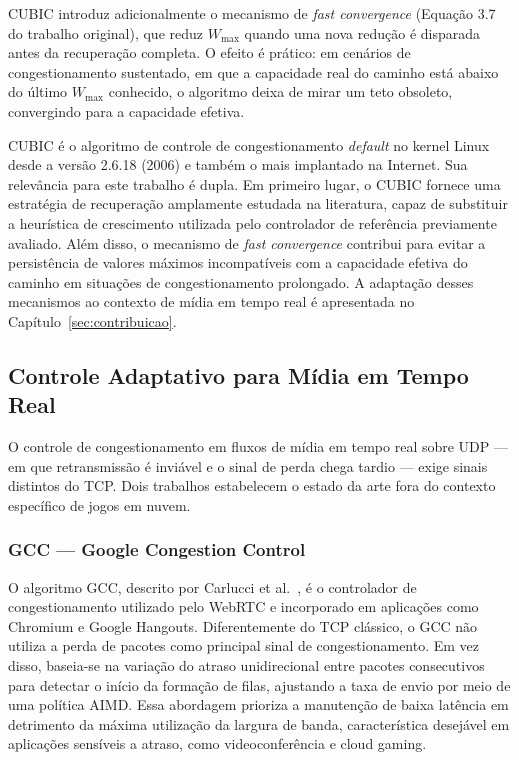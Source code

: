 CUBIC introduz adicionalmente o mecanismo de \emph{fast
convergence} (Equação 3.7 do trabalho original), que reduz
$W_{\max}$ quando uma nova redução é disparada antes da
recuperação completa. O efeito é prático: em cenários de
congestionamento sustentado, em que a capacidade real do
caminho está abaixo do último $W_{\max}$ conhecido, o algoritmo
deixa de mirar um teto obsoleto, convergindo para a capacidade
efetiva.

CUBIC é o algoritmo de controle de congestionamento \emph{default}
no kernel Linux desde a versão 2.6.18 (2006) e também o
mais implantado na Internet. Sua relevância para este trabalho é dupla. Em primeiro lugar,
o CUBIC fornece uma estratégia de recuperação amplamente estudada
na literatura, capaz de substituir a heurística de crescimento
utilizada pelo controlador de referência previamente avaliado.
Além disso, o mecanismo de \emph{fast convergence} contribui para
evitar a persistência de valores máximos incompatíveis com a
capacidade efetiva do caminho em situações de congestionamento
prolongado. A adaptação desses mecanismos ao contexto de mídia em
tempo real é apresentada no Capítulo~\ref{sec:contribuicao}.

\subsection{Controle Adaptativo para Mídia em Tempo Real}

O controle de congestionamento em fluxos de mídia em tempo real
sobre UDP — em que retransmissão é inviável e o sinal de perda
chega tardio — exige sinais distintos do TCP. Dois trabalhos
estabelecem o estado da arte fora do contexto específico de
jogos em nuvem.

\subsubsection{GCC --- Google Congestion Control}

O algoritmo GCC, descrito por Carlucci et al.~\cite{gcc}, é o controlador de congestionamento utilizado pelo WebRTC e incorporado em aplicações como Chromium e Google Hangouts. Diferentemente do TCP clássico, o GCC não utiliza a perda de pacotes como principal sinal de congestionamento. Em vez disso, baseia-se na variação do atraso unidirecional entre pacotes consecutivos para detectar o início da formação de filas, ajustando a taxa de envio por meio de uma política AIMD. Essa abordagem prioriza a manutenção de baixa latência em detrimento da máxima utilização da largura de banda, característica desejável em aplicações sensíveis a atraso, como videoconferência e cloud gaming.

